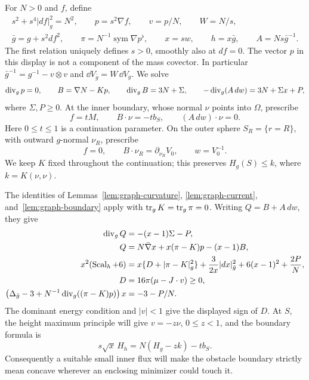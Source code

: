 For \(N>0\) and \(f\), define
\begin{equation}\label{eq:ah-fields}
 \begin{gathered}
 s^2+s^4|df|_g^2=N^2,\qquad p=s^2\nabla f,\qquad
 v=p/N,\qquad W=N/s,\\
 \bar g=g+s^2df^2,\qquad
 \pi=N^{-1}\operatorname{sym}\nabla p^\flat,\qquad
 x=sw,\qquad h=x\bar g,\qquad A=Ns\bar g^{-1}.
 \end{gathered}
\end{equation}
The first relation uniquely defines \(s>0\), smoothly also at \(df=0\).
The vector \(p\) in this display is not a component of the mass
covector.  In particular
\(\bar g^{-1}=g^{-1}-v\otimes v\) and
\(\dd V_{\bar g}=W\,\dd V_g\).
We solve
\begin{equation}\label{eq:ah-system}
 \operatorname{div}_g p=0,\qquad B=\nabla N-Kp,\qquad
 \operatorname{div}_g B=3N+\Sigma,\qquad
 -\operatorname{div}_g(A\,dw)=3N+\Sigma x+P ,
\end{equation}
where \(\Sigma,P\ge0\).  At the inner boundary, whose normal
\(\nu\) points into \(\Omega\), prescribe
\begin{equation}\label{eq:ah-inner-data}
 f=tM,\qquad B\cdot\nu=-t b_S,\qquad (A\,dw)\cdot\nu=0 .
\end{equation}
Here \(0\le t\le1\) is a continuation parameter.  On the outer
sphere \(S_R=\{r=R\}\), with outward \(g\)-normal \(\nu_R\), prescribe
\begin{equation}\label{eq:ah-outer-data}
 f=0,\qquad B\cdot\nu_R=\partial_{\nu_R}V_0,\qquad
 w=V_0^{-1}.
\end{equation}
We keep \(K\) fixed throughout the continuation; this preserves
\(H_g(S)\le k\), where \(k=K(\nu,\nu)\).

The identities of Lemmas~\ref{lem:graph-curvature},
\ref{lem:graph-current}, and~\ref{lem:graph-boundary} apply with
\(\operatorname{tr}_gK=\operatorname{tr}_g\pi=0\).  Writing \(Q=B+A\,dw\), they give
\begin{align}
 \operatorname{div}_g Q&=-(x-1)\Sigma-P,\nonumber\\
 Q&=N\bar\nabla x+x(\pi-K)p-(x-1)B,\label{eq:ah-current}\\
 x^2(\operatorname{Scal}_h+6)
 &=x\{D+|\pi-K|_g^2\}
   +\frac{3}{2x}|dx|_{\bar g}^2+6(x-1)^2+\frac{2P}{N},
 \label{eq:ah-scalar}\\
 D&=16\pi(\mu-J\cdot v)\ge0,\nonumber\\
 \left(\Delta_{\bar g}-3+
  N^{-1}\operatorname{div}_g((\pi-K)p)\right)x&=-3-P/N .
 \label{eq:ah-x-equation}
\end{align}
The dominant energy condition and \(|v|<1\) give the displayed
sign of \(D\).  At \(S\), the height maximum principle will give
\(v=-z\nu\), \(0\le z<1\), and the boundary formula is
\begin{equation}\label{eq:ah-boundary-curvature}
 s\sqrt{x}\,H_h=N(H_g-zk)-t b_S .
\end{equation}
Consequently a suitable small inner flux will make the obstacle
boundary strictly mean concave wherever an enclosing minimizer
could touch it.


